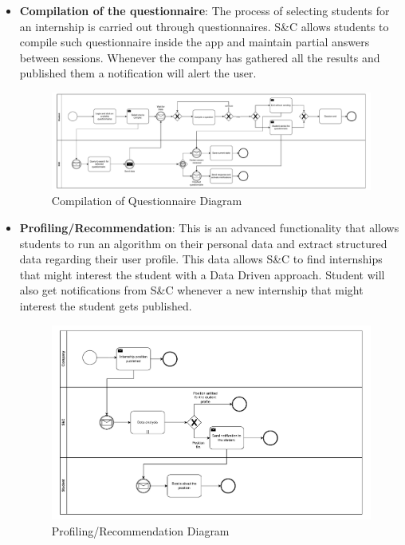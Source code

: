 \begin{itemize}
      \item \textbf{Compilation of the questionnaire}: The process of selecting students for an internship is carried
            out through questionnaires. S\&C allows students to compile such questionnaire inside the app and maintain
            partial answers between sessions. Whenever the company has gathered all the results and published them a
            notification will alert the user.

            \begin{figure}[H]
                  \centering
                  \includegraphics[width=1.0\textwidth]{Images/BPMN_5.pdf}
                  \caption{Compilation of Questionnaire Diagram}
                  \label{fig:compilation_of_the_questionnaire_diagram}
            \end{figure}
      \item \textbf{Profiling/Recommendation}: This is an advanced functionality that allows students to run an
            algorithm on their personal data and extract structured data regarding their user profile. This data allows
            S\&C to find internships that might interest the student with a Data Driven approach. Student will also get
            notifications from S\&C whenever a new internship that might interest the student gets published.

            \begin{figure}[H]
                  \centering
                  \includegraphics[width=1.0\textwidth]{Images/BPMN_6.pdf}
                  \caption{Profiling/Recommendation Diagram}
                  \label{fig:profiling_recommendation_diagram}
            \end{figure}

\end{itemize}

